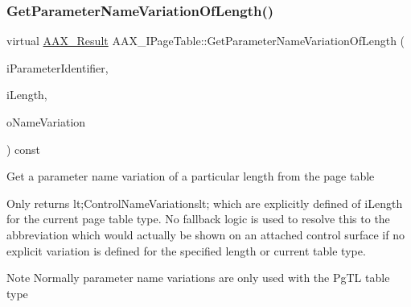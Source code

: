 \mbox{\label{a01849_a6ddd61f6ba18b8be8141363d5234ed9d}} 
\subsubsection{\texorpdfstring{GetParameterNameVariationOfLength()}{GetParameterNameVariationOfLength()}}
{\footnotesize\ttfamily virtual \mbox{\hyperlink{a00392_a4d8f69a697df7f70c3a8e9b8ee130d2f}{A\+A\+X\+\_\+\+Result}} A\+A\+X\+\_\+\+I\+Page\+Table\+::\+Get\+Parameter\+Name\+Variation\+Of\+Length (\begin{DoxyParamCaption}\item[{\mbox{\hyperlink{a00392_ab4e01b971dac1b25632fd9f710dd8f77}{A\+A\+X\+\_\+\+C\+Page\+Table\+Param\+ID}}}]{i\+Parameter\+Identifier,  }\item[{int32\+\_\+t}]{i\+Length,  }\item[{\mbox{\hyperlink{a01873}{A\+A\+X\+\_\+\+I\+String}} \&}]{o\+Name\+Variation }\end{DoxyParamCaption}) const\hspace{0.3cm}{\ttfamily [pure virtual]}}

Get a parameter name variation of a particular length from the page table

Only returns {\ttfamily lt;Control\+Name\+Variationslt;} which are explicitly defined of {\ttfamily i\+Length} for the current page table type. No fallback logic is used to resolve this to the abbreviation which would actually be shown on an attached control surface if no explicit variation is defined for the specified length or current table type.

\begin{DoxyNote}{Note}
Normally parameter name variations are only used with the {\ttfamily \textquotesingle{}Pg\+TL\textquotesingle{}} table type
\end{DoxyNote}

